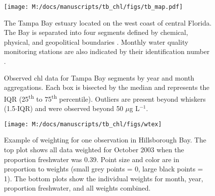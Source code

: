 \documentclass{svjour3}\usepackage[]{graphicx}\usepackage[]{color}
\newcommand{\mugl}{$\mu$g L$^{-1}$}
\begin{document}
\clearpage


\begin{figure}
\centering
\texttt{[image: M:/docs/manuscripts/tb\_chl/figs/tb\_map.pdf]}
\caption{The Tampa Bay estuary located on the west coast of central Florida. The Bay is separated into four segments defined by chemical, physical, and geopolitical boundaries \cite{Lewis85}. Monthly water quality monitoring stations are also indicated by their identification number \cite{Boler01}.}
\label{fig:tb_map}
\end{figure}


\begin{figure}
\centering
{}


\leavevmode\smash{\makebox[0pt]{\hspace{0em}%
  \rotatebox[origin=l]{90}{\hspace{19em}%
    Chlorophyll-\textit{a} (\mugl)}%
}}\hspace{0pt plus 1filll}\null

\caption{Observed \ac{chl} data for Tampa Bay segments by \protect{} year and \protect{} month aggregations.  Each box is bisected by the median and represents the \ac{IQR} (25\textsuperscript{th} to 75\textsuperscript{th} percentile).  Outliers are present beyond whiskers (1.5$\cdot$\ac{IQR}) and were observed beyond 50 \mugl.}
\label{fig:obsyrmo}
\end{figure}

\begin{figure}[!ht]


{\centering \texttt{[image: M:/docs/manuscripts/tb\_chl/figs/wtex]} 

}

\caption[Example of weighting for one observation in Hillsborough Bay]{Example of weighting for one observation in Hillsborough Bay.  The top plot shows all data weighted for October 2003 when the proportion freshwater was 0.39.  Point size and color are in proportion to weights (small grey points = 0, large black points = 1).  The bottom plots show the individual weights for month, year, proportion freshwater, and all weights combined.\label{fig:wtex}}
\end{figure}
\end{document}
